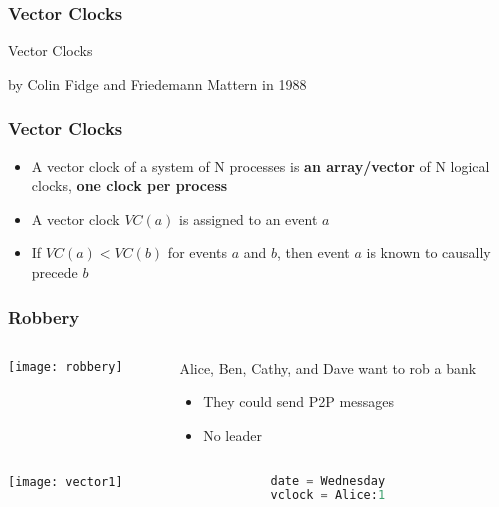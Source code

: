 \documentclass[aspectratio=169, 15pt,usenames,dvipsnames]{beamer}
\begin{document}
	\begin{gdblank}
		\frametitle{Vector Clocks}
		\centering
		\LARGE
		Vector Clocks
		\par\large
		by Colin Fidge and Friedemann Mattern in 1988
	\end{gdblank}
	\begin{gdblank}
		\frametitle{Vector Clocks}
		\centering
		\large
		\begin{itemize}
			\item A vector clock of a system of N processes is \textbf{an array/vector} of N logical clocks, \textbf{one clock per process}
			\item A vector clock $VC(a)$ is assigned to an event $a$
			\item If $VC(a)<VC(b)$ for events $a$ and $b$, then event $a$ is known to causally precede $b$
		\end{itemize}
	\end{gdblank}
	\begin{gdblank}
		\frametitle{Robbery}
		\begin{columns}
			\begin{column}{0.5\textwidth}
				\texttt{[image: robbery]}			
			\end{column}
			\begin{column}{0.5\textwidth}
				Alice, Ben, Cathy, and Dave want to rob a bank
				\par\large
				\begin{itemize}
					\item They could send P2P messages
					\item No leader
				\end{itemize}
			\end{column}	
		\end{columns}
	\end{gdblank}	
	\cprotEnv\begin{gdblank}
	\begin{columns}
		\begin{column}{0.5\textwidth}
			\texttt{[image: vector1]}			
		\end{column}
		\begin{column}{0.5\textwidth}				
			\begin{lstlisting}[language=Python]
date = Wednesday
vclock = Alice:1
			\end{lstlisting}
		\end{column}			
	\end{columns} 
	\note{
		Среда
	}
	\end{gdblank}
\end{document}
